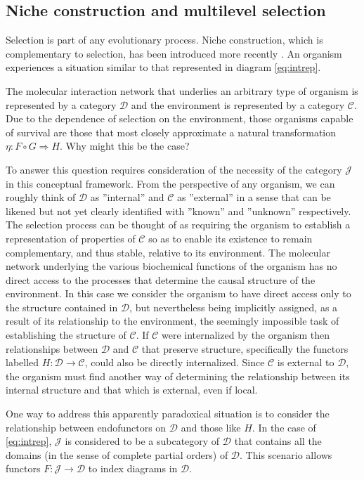 \documentclass[aps,twocolumn]{revtex4}
\begin{document}
\subsection{Niche construction and multilevel selection}
Selection is part of any evolutionary process. Niche construction, which is complementary to selection, has been introduced more recently \cite{Odling-Smee2003,Krakauer2009}. An organism experiences a situation similar to that represented in diagram \ref{eq:intrep}. 

 

The molecular interaction network that underlies an arbitrary type of organism is represented by a category $\mathcal{D}$ and the environment is represented by a category $\mathcal{C}$. Due to the dependence of selection on the environment, those organisms capable of survival are those that most closely approximate a natural transformation $\eta:F \circ G \Rightarrow H$. Why might this be the case?

To answer this question requires consideration of the necessity of the category $\mathcal{J}$ in this conceptual framework. From the perspective of any organism, we can roughly think of $\mathcal{D}$ as ''internal'' and $\mathcal{C}$ as ''external'' in a sense that can be likened but not yet clearly identified with ''known'' and ''unknown'' respectively. The selection process can be thought of as requiring the organism to establish a representation of properties of $\mathcal{C}$ so as to enable its existence to remain complementary, and thus stable, relative to its environment. The molecular network underlying the various biochemical functions of the organism has no direct access to the processes that determine the causal structure of the environment. In this case we consider the organism to have direct access only to the structure contained in $\mathcal{D}$, but nevertheless being implicitly assigned, as a result of its relationship to the environment, the seemingly impossible task of establishing the structure of $\mathcal{C}$. If $\mathcal{C}$ were internalized by the organism then relationships between $\mathcal{D}$ and $\mathcal{C}$ that preserve structure, specifically the functors labelled $H:\mathcal{D} \rightarrow \mathcal{C}$, could also be directly internalized. Since $\mathcal{C}$ is external to $\mathcal{D}$, the organism must find another way of determining the relationship between its internal structure and that which is external, even if local.

One way to address this apparently paradoxical situation is to consider the relationship between endofunctors on $\mathcal{D}$ and those like $H$. In the case of \ref{eq:intrep}, $\mathcal{J}$ is considered to be a subcategory of $\mathcal{D}$ that contains all the domains (in the sense of complete partial orders) of $\mathcal{D}$. This scenario allows functors $F:\mathcal{J} \rightarrow \mathcal{D}$ to index diagrams in $\mathcal{D}$.
\end{document}
